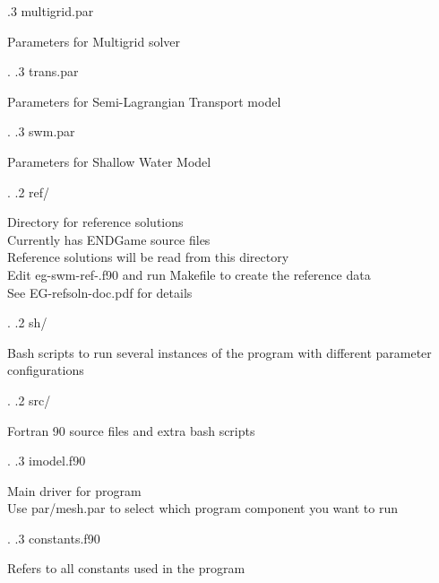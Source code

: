 \documentclass[a4paper,10pt]{article}
\begin{document}
{.3 multigrid{.}par \hspace{1cm}  \begin{minipage}[t]{10cm}
	    Parameters for Multigrid solver\\
          \end{minipage}.
.3 trans{.}par \hspace{1cm}  \begin{minipage}[t]{10cm}
	    Parameters for Semi-Lagrangian Transport model\\
          \end{minipage}.
.3 swm{.}par \hspace{1cm}  \begin{minipage}[t]{10cm}
	    Parameters for Shallow Water Model\\
          \end{minipage}.
.2 ref/ \hspace{1cm}  \begin{minipage}[t]{10cm}
          Directory for reference solutions\\
	  Currently has ENDGame source files\\
	  Reference solutions will be read from this directory\\
	  Edit eg-swm-ref-{.}f90 and run Makefile to create the reference data \\
	  See EG-refsoln-doc{.}pdf for details
          \end{minipage}.
.2 sh/ \hspace{1cm}  \begin{minipage}[t]{10cm}
          Bash scripts to run several instances of the program with different parameter configurations
          \end{minipage}.
.2 src/ \hspace{1cm}  \begin{minipage}[t]{10cm}
          Fortran 90 source files and extra bash scripts\\
          \end{minipage}.
.3 imodel{.}f90 \hspace{1cm}  \begin{minipage}[t]{10cm}
          Main driver for program\\
	  Use par/mesh{.}par to select which program component you want to run\\
	  \end{minipage}.
.3 constants{.}f90 \hspace{1cm}  \begin{minipage}[t]{10cm}
          Refers to all constants used in the program\\

\end{minipage}}
\end{document}
